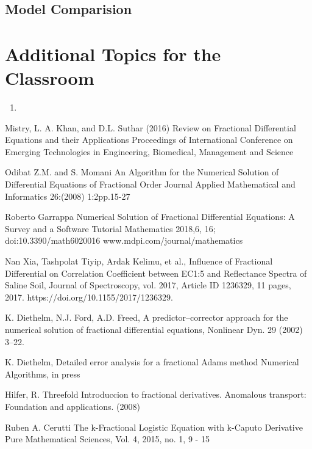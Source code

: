 \subsection{Model Comparision}

\section{Additional Topics for the Classroom}

\begin{enumerate}
\item 
\end{enumerate}



\begin{thebibliography}{00}

 Mistry, L. A. Khan, and D.L. Suthar (2016)
\newblock Review on Fractional Differential Equations and their Applications
\newblock Proceedings of International Conference on Emerging Technologies in Engineering, Biomedical, Management and Science 

 Odibat Z.M. and S. Momani
\newblock An Algorithm for the Numerical Solution of Differential Equations of Fractional Order
\newblock Journal Applied Mathematical and Informatics 26:(2008) 1:2pp.15-27

 Roberto Garrappa
\newblock Numerical Solution of Fractional Differential Equations: A Survey and a Software Tutorial
\newblock Mathematics 2018,6, 16; doi:10.3390/math6020016 www.mdpi.com/journal/mathematics

 Nan Xia, Tashpolat Tiyip, Ardak Kelimu, et al., 
\newblock Influence of Fractional Differential on Correlation Coefficient between EC1:5 and Reflectance Spectra of Saline Soil,
\newblock Journal of Spectroscopy, vol. 2017, Article ID 1236329, 11 pages, 2017. https://doi.org/10.1155/2017/1236329.

K. Diethelm, N.J. Ford, A.D. Freed, 
\newblock A predictor–corrector approach for the numerical solution of fractional differential equations, 
\newblock Nonlinear Dyn. 29 (2002) 3–22.
 
 K. Diethelm, 
\newblock Detailed error analysis for a fractional Adams method
\newblock Numerical Algorithms, in press

 Hilfer,  R.
\newblock Threefold  Introduccion  to  fractional  derivatives.  
\newblock Anomalous transport:  Foundation and applications. (2008)

 Ruben A. Cerutti
\newblock The k-Fractional Logistic Equation with k-Caputo Derivative
\newblock Pure Mathematical Sciences, Vol.  4, 2015, no.  1, 9 - 15

\end{thebibliography}


